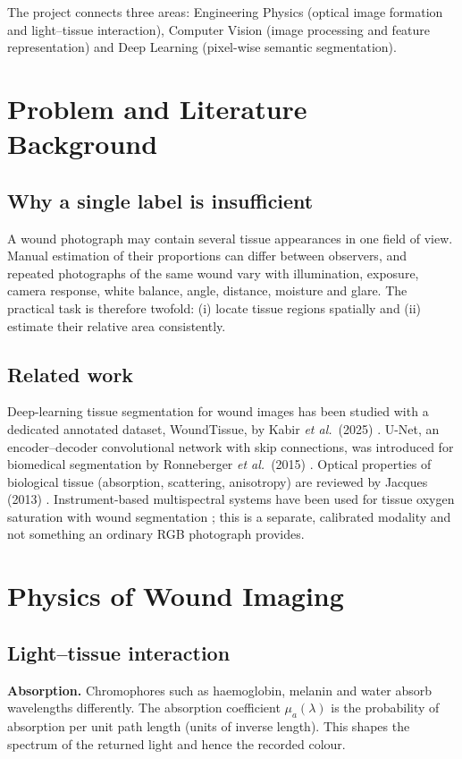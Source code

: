 \documentclass[12pt,a4paper]{article}
\begin{document}
The project connects three areas: Engineering Physics (optical image formation and light--tissue interaction), Computer Vision (image processing and feature representation) and Deep Learning (pixel-wise semantic segmentation).

\section{Problem and Literature Background}
\subsection{Why a single label is insufficient}
A wound photograph may contain several tissue appearances in one field of view. Manual estimation of their proportions can differ between observers, and repeated photographs of the same wound vary with illumination, exposure, camera response, white balance, angle, distance, moisture and glare. The practical task is therefore twofold: (i) locate tissue regions spatially and (ii) estimate their relative area consistently.

\subsection{Related work}
Deep-learning tissue segmentation for wound images has been studied with a dedicated annotated dataset, WoundTissue, by Kabir \textit{et al.}\ (2025) \cite{kabir2025}. U-Net, an encoder--decoder convolutional network with skip connections, was introduced for biomedical segmentation by Ronneberger \textit{et al.}\ (2015) \cite{unet}. Optical properties of biological tissue (absorption, scattering, anisotropy) are reviewed by Jacques (2013) \cite{jacques}. Instrument-based multispectral systems have been used for tissue oxygen saturation with wound segmentation \cite{multispectral}; this is a separate, calibrated modality and not something an ordinary RGB photograph provides.

\section{Physics of Wound Imaging}
\subsection{Light--tissue interaction}
\textbf{Absorption.} Chromophores such as haemoglobin, melanin and water absorb wavelengths differently. The absorption coefficient $\mu_a(\lambda)$ is the probability of absorption per unit path length (units of inverse length). This shapes the spectrum of the returned light and hence the recorded colour.
\end{document}
